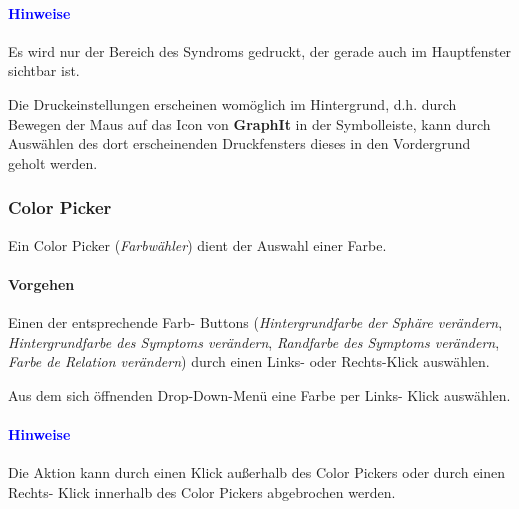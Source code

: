 \documentclass[enabledeprecatedfontcommands,fontsize=11pt,paper=a4,twoside]{scrartcl}
\newcounter{one}
\newcounter{two}[one]
\newcommand*{\hint}{\paragraph{\textcolor{blue}{Hinweise}}}
\newcommand*{\action}{\paragraph{Vorgehen}}
\let\tempone\itemize
\let\temptwo\enditemize
\renewenvironment{itemize}{\tempone\addtolength{\itemsep}{-10.0pt}}{\temptwo}
\let\origenumerate\enumerate
\let\origendenumerate\endenumerate
\renewenvironment{enumerate}{\origenumerate \addtolength{\itemsep}{-10.0pt}}{\origendenumerate}
\begin{document}
\hint
\begin{itemize}
	\item Es wird nur der Bereich des Syndroms gedruckt, der gerade auch im Hauptfenster sichtbar ist.
	\item Die Druckeinstellungen erscheinen womöglich im Hintergrund, d.h. durch Bewegen der Maus auf das Icon von \textbf{GraphIt} in der Symbolleiste, kann durch Auswählen des dort erscheinenden Druckfensters dieses in den Vordergrund geholt werden. 
\end{itemize}

\subsubsection{Color Picker} \label{colorpicker}
Ein Color Picker (\textit{Farbwähler}) dient der Auswahl einer Farbe. 
\action
\begin{enumerate}
	\item Einen der entsprechende Farb- Buttons (\textit{Hintergrundfarbe der Sphäre verändern}, \textit{Hintergrundfarbe des Symptoms verändern}, \textit{Randfarbe des Symptoms verändern}, \textit{Farbe de Relation verändern}) durch einen Links- oder Rechts-Klick auswählen. 
	\item Aus dem sich öffnenden  Drop-Down-Menü eine Farbe per Links- Klick auswählen. 
\end{enumerate}
\hint
\begin{itemize}
	\item Die Aktion kann durch einen Klick außerhalb des Color Pickers oder durch einen Rechts- Klick innerhalb des Color Pickers abgebrochen werden. 
\end{itemize}
\end{document}
